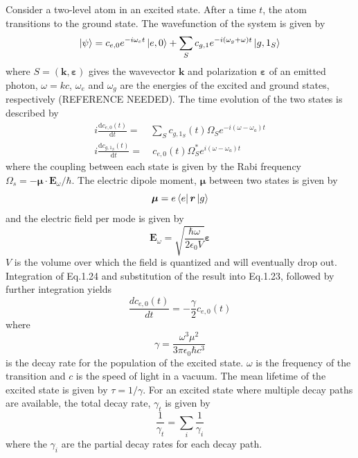 \documentclass[12pt,a4paper,margin=1in]{report}
\begin{document}
Consider a two-level atom in an excited state. After a time $t$, the atom transitions to the ground state. The wavefunction of the system is given by
\begin{equation}
\ket{\psi} = c_{e,0}e^{-i\omega_et}\ket{e,0} + \sum_Sc_{g,1}e^{-i(\omega_g+\omega)t}\ket{g,1_S}
\end{equation}
where $S = (\bm{k},\bm{\varepsilon})$ gives the wavevector $\bm{k}$ and polarization $\bm{\varepsilon}$ of an emitted photon, $\omega = kc$, $\omega_e$ and $\omega_g$ are the energies of the excited and ground states, respectively (REFERENCE NEEDED). The time evolution of the two states is described by
\begin{align}
i\frac{\mathrm{d}c_{e,0}(t)}{\mathrm{d}t} =& \sum_Sc_{g,1_S}(t)\Omega_S e^{-i(\omega-\omega_a)t}\\
i\frac{\mathrm{d}c_{g,1_S}(t)}{\mathrm{d}t} =& \ c_{e,0}(t)\Omega_S^*e^{i(\omega-\omega_a)t}
\end{align}
where the coupling between each state is given by the Rabi frequency \\$\Omega_s = -\bm{\mu}\cdot\bm{E}_{\omega}/\hbar$. The electric dipole moment, $\bm{\mu}$ between two states is given by
\begin{equation}
\bm{\mu} = e\bra{e}\bm{r}\ket{g} 
\end{equation}
and the electric field per mode is given by
\begin{equation}
\bm{E}_{\omega} = \sqrt{\frac{\hbar\omega}{2\epsilon_0V}}\bm{\varepsilon}
\end{equation}
$V$ is the volume over which the field is quantized and will eventually drop out. Integration of Eq.1.24 and substitution of the result into Eq.1.23, followed by further integration yields 
\begin{equation}
\frac{d c_{e,0}(t)}{dt} = -\frac{\gamma}{2}c_{e,0}(t)
\end{equation}
where
\begin{equation}
\gamma = \frac{\omega^3\mu^2}{3\pi\epsilon_0\hbar c^3}
\label{gamma}
\end{equation}
is the decay rate for the population of the excited state. $\omega$ is the frequency of the transition and $c$ is the speed of light in a vacuum. The mean lifetime of the excited state is given by $\tau = 1/\gamma$. For an excited state where multiple decay paths are available, the total decay rate, $\gamma_t$ is given by
\begin{equation}
\frac{1}{\gamma_t} = \sum_i \frac{1}{\gamma_i}
\label{totdec}
\end{equation}
where the $\gamma_i$ are the partial decay rates for each decay path.
\end{document}
